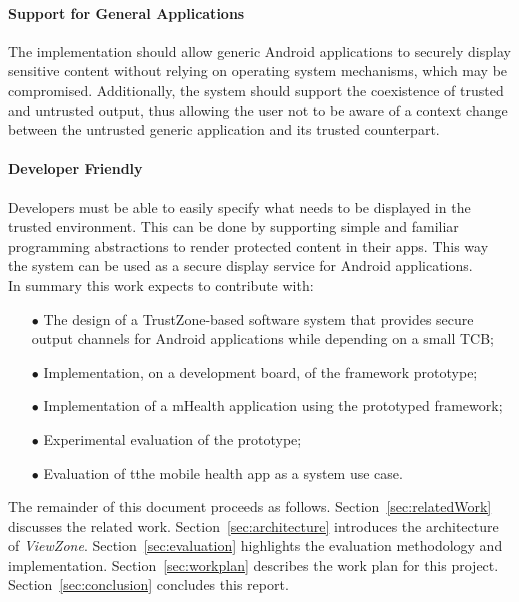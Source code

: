 \paragraph*{\textbf{Support for General Applications\\}} The implementation should allow generic Android applications to securely display sensitive content without relying on operating system mechanisms, which may be compromised. Additionally, the system should support the coexistence of trusted and untrusted output, thus allowing the user not to be aware of a context change between the untrusted generic application and its trusted counterpart.

\paragraph*{\textbf{Developer Friendly\\}} Developers must be able to easily specify what needs to be displayed in the trusted environment. This can be done by supporting simple and familiar programming abstractions to render protected content in their apps. This way the system can be used as a secure display service for Android applications.\\

In summary this work expects to contribute with:
\begin{itemize}
	\item[$\bullet$] The design of a TrustZone-based software system that provides secure output channels for Android applications while depending on a small TCB;
	\item[$\bullet$] Implementation, on a development board, of the framework prototype;
	\item[$\bullet$] Implementation of a mHealth application using the prototyped framework;
	\item[$\bullet$] Experimental evaluation of the prototype;
	\item[$\bullet$] Evaluation of tthe mobile health app as a system use case.
\end{itemize}

%
The remainder of this document proceeds as follows. Section~\ref{sec:relatedWork} discusses the related work. Section~\ref{sec:architecture} introduces the architecture of \emph{ViewZone}. Section~\ref{sec:evaluation} highlights the evaluation methodology and implementation. Section~\ref{sec:workplan} describes the work plan for this project. Section~\ref{sec:conclusion} concludes this report.